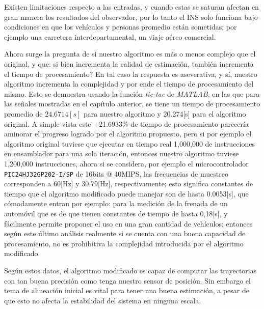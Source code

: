 \documentclass[conference]{IEEEtran}
\begin{document}
Existen limitaciones respecto a las entradas, y cuando estas se saturan afectan en gran manera los resultados del observador, por lo tanto el INS solo funciona bajo condiciones en que los vehículos y personas promedio están sometidas; por ejemplo una carretera interdepartamental, un viaje aéreo comercial.\par
Ahora surge la pregunta de si nuestro algoritmo es más o menos complejo que el original, y que: si bien incrementa la calidad de estimación, también incrementa el tiempo de procesamiento? En tal caso la respuesta es aseverativa, y sí, nuestro algoritmo incrementa la complejidad y por ende el tiempo de procesamiento del mismo. Esto se demuestra usando la función \emph{tic-tac} de \textsl{MATLAB}, en las que para las señales mostradas en el capítulo anterior, se tiene un tiempo de procesamiento promedio de $24.6714[s]$ para nuestro algoritmo y 20.274[s] para el algoritmo original. A simple vista este +21.6933\% de tiempo de procesamiento parecería aminorar el progreso logrado por el algoritmo propuesto, pero si por ejemplo el algoritmo original tuviese que ejecutar en tiempo real 1,000,000 de instrucciones en ensamblador para una sola iteración, entonces nuestro algoritmo tuviese 1,200,000 instrucciones, ahora si se considera, por ejemplo el microcontrolador \texttt{PIC24HJ32GP202-I/SP} de 16bits @ 40MIPS, las frecuencias de muestreo corresponden a 60[Hz] y 30.79[Hz], respectivamente; esto significa constantes de tiempo que el algoritmo modificado puede manejar son de hasta 0.0053[s], que cómodamente entran por ejemplo: para la medición de la frenada de un automóvil que es de que tienen constantes de tiempo de hasta 0,18[s], y fácilmente permite proponer el uso en una gran cantidad de vehículos; entonces según este último análisis realmente si se cuenta con una buena capacidad de procesamiento, no es prohibitiva la complejidad introducida por el algoritmo modificado.\par
Según estos datos, el algoritmo modificado es capaz de computar las trayectorias con tan buena precisión como tenga nuestro sensor de posición. Sin embargo el tema de alineación inicial es vital para tener una buena estimación, a pesar de que esto no afecta la estabilidad del sistema en ninguna escala.
%
%
\end{document}
